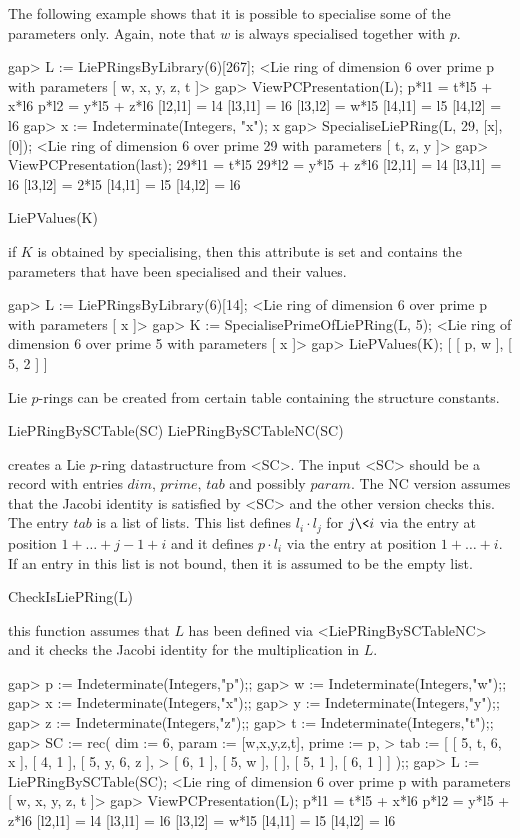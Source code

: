 The following example shows that it is possible to specialise some of
the parameters only. Again, note that $w$ is always specialised together
with $p$.

\beginexample
gap> L := LiePRingsByLibrary(6)[267];
<Lie ring of dimension 6 over prime p with parameters [ w, x, y, z, t ]>
gap> ViewPCPresentation(L);
p*l1 = t*l5 + x*l6
p*l2 = y*l5 + z*l6
[l2,l1] = l4
[l3,l1] = l6
[l3,l2] = w*l5
[l4,l1] = l5
[l4,l2] = l6
gap> x := Indeterminate(Integers, "x");
x
gap> SpecialiseLiePRing(L, 29, [x], [0]);
<Lie ring of dimension 6 over prime 29 with parameters [ t, z, y ]>
gap> ViewPCPresentation(last);
29*l1 = t*l5
29*l2 = y*l5 + z*l6
[l2,l1] = l4
[l3,l1] = l6
[l3,l2] = 2*l5
[l4,l1] = l5
[l4,l2] = l6
\endexample


\> LiePValues(K)

if $K$ is obtained by specialising, then this attribute is set and 
contains the parameters that have been specialised and their values.

\beginexample
gap>  L := LiePRingsByLibrary(6)[14];
<Lie ring of dimension 6 over prime p with parameters [ x ]>
gap>  K := SpecialisePrimeOfLiePRing(L, 5);
<Lie ring of dimension 6 over prime 5 with parameters [ x ]>
gap> LiePValues(K);
[ [ p, w ], [ 5, 2 ] ]
\endexample


Lie $p$-rings can be created from certain table containing the structure
constants.

\> LiePRingBySCTable(SC)
\> LiePRingBySCTableNC(SC)

creates a Lie $p$-ring datastructure from <SC>. The input <SC> should be
a record with entries $dim$, $prime$, $tab$ and possibly $param$. The
NC version assumes that the Jacobi identity is satisfied by <SC> and the
other version checks this. The entry $tab$ is a list of lists. This list
defines $l_i \cdot l_j$ for $j \< i$ via the entry at position 
$1+\ldots+j-1+i$ and it defines $p \cdot l_i$ via the entry at position 
$1+\ldots+i$. If an entry in this list is not bound, then it is assumed 
to be the empty list.

\> CheckIsLiePRing(L) 

this function assumes that $L$ has been defined via <LiePRingBySCTableNC> 
and it checks the Jacobi identity for the multiplication in $L$.

\beginexample
gap> p := Indeterminate(Integers,"p");;
gap> w := Indeterminate(Integers,"w");;
gap> x := Indeterminate(Integers,"x");;
gap> y := Indeterminate(Integers,"y");;
gap> z := Indeterminate(Integers,"z");;
gap> t := Indeterminate(Integers,"t");;
gap> SC := rec( dim := 6, param := [w,x,y,z,t], prime := p, 
>               tab := [ [ 5, t, 6, x ], [ 4, 1 ], [ 5, y, 6, z ],
>                        [ 6, 1 ], [ 5, w ], [  ], [ 5, 1 ], [ 6, 1 ] ] );;
gap> L := LiePRingBySCTable(SC);
<Lie ring of dimension 6 over prime p with parameters [ w, x, y, z, t ]>
gap> ViewPCPresentation(L);
p*l1 = t*l5 + x*l6
p*l2 = y*l5 + z*l6
[l2,l1] = l4
[l3,l1] = l6
[l3,l2] = w*l5
[l4,l1] = l5
[l4,l2] = l6
\endexample

